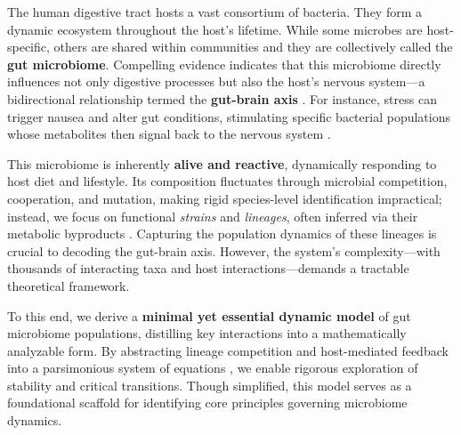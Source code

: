 

		The human digestive tract hosts a vast consortium of bacteria. They form a dynamic ecosystem throughout the host's lifetime. While some microbes are host-specific, others are shared within communities and they are collectively called the \textbf{gut microbiome}. Compelling evidence indicates that this microbiome directly influences not only digestive processes but also the host's nervous system---a bidirectional relationship termed the \textbf{gut-brain axis} \cite{SCHLOMANN201956}. For instance, stress can trigger nausea and alter gut conditions, stimulating specific bacterial populations whose metabolites then signal back to the nervous system \cite{MAGNUSDOTTIR201890}.

		This microbiome is inherently \textbf{alive and reactive}, dynamically responding to host diet and lifestyle. Its composition fluctuates through microbial competition, cooperation, and mutation, making rigid species-level identification impractical; instead, we focus on functional \textit{strains} and \textit{lineages}, often inferred via their metabolic byproducts \cite{RiosGarza2023}. Capturing the population dynamics of these lineages is crucial to decoding the gut-brain axis. However, the system's complexity---with thousands of interacting taxa and host interactions---demands a tractable theoretical framework.

		To this end, we derive a \textbf{minimal yet essential dynamic model} of gut microbiome populations, distilling key interactions into a mathematically analyzable form. By abstracting lineage competition and host-mediated feedback into a parsimonious system of equations \cite{murray2002}, we enable rigorous exploration of stability and critical transitions. Though simplified, this model serves as a foundational scaffold for identifying core principles governing microbiome dynamics.
